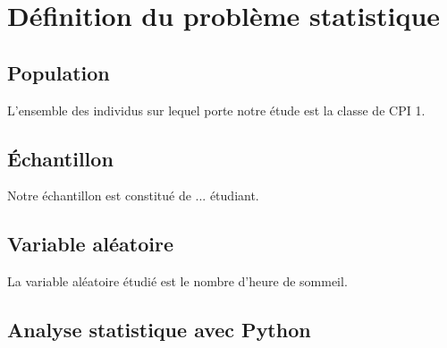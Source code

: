 \documentclass[rapport]{subfiles}
\begin{document}
	\section{Définition du problème statistique}
	\subsection{Population}
	L’ensemble des individus sur lequel porte notre étude est la classe de CPI 1.
	\subsection{Échantillon}
	Notre échantillon est constitué de ... étudiant.
	\subsection{Variable aléatoire}
	La variable aléatoire étudié est le nombre d'heure de sommeil.
	\subsection{Analyse statistique avec Python}
	
\end{document}
